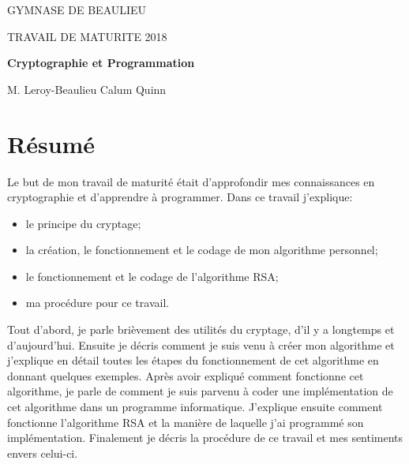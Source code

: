 \documentclass[a4paper,12pt]{report}
\begin{document}
     
\begin{titlepage}
	\centering
	  \centerline{\large{GYMNASE DE BEAULIEU}}
     \centerline{\large{TRAVAIL DE MATURITE 2018}}
	\vspace{7cm}
	{\LARGE\bfseries Cryptographie et Programmation\par}

	\vfill

M. Leroy-Beaulieu\hspace*{\fill} Calum Quinn\newline
\vspace{0.5cm}
\end{titlepage}     

\section*{Résumé}
Le but de mon travail de maturité était d'approfondir mes connaissances en cryptographie et d'apprendre à programmer. \newline
\newline
Dans ce travail j'explique:
\begin{itemize}
\item le principe du cryptage;
\item la création, le fonctionnement et le codage de mon algorithme personnel;
\item le fonctionnement et le codage de l'algorithme RSA;
\item ma procédure pour ce travail.
\end{itemize}
Tout d'abord, je parle brièvement des utilités du cryptage, d'il y a longtemps et d'aujourd'hui.\newline
\newline
Ensuite je décris comment je suis venu à créer mon algorithme et j'explique en détail toutes les étapes du fonctionnement de cet algorithme en donnant quelques exemples. Après avoir expliqué comment fonctionne cet algorithme, je parle de comment je suis parvenu à coder une implémentation de cet algorithme dans un programme informatique. \newline
\newline
J'explique ensuite comment fonctionne l'algorithme RSA et la manière de laquelle j'ai programmé son implémentation. \newline
\newline
Finalement je décris la procédure de ce travail et mes sentiments envers celui-ci.
\pagebreak
\end{document}
